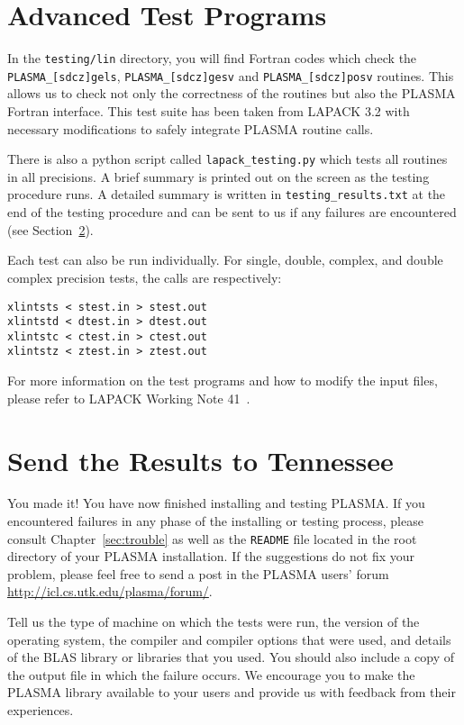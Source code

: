 \section{Advanced Test Programs}
In the \texttt{testing/lin} directory, you will find Fortran codes which check
the \texttt{PLASMA\_[sdcz]gels}, \texttt{PLASMA\_[sdcz]gesv} and \texttt{PLASMA\_[sdcz]posv} routines. 
This allows us to check not only the correctness of the routines but also the PLASMA 
Fortran interface. This test suite has been taken from LAPACK 3.2 with
necessary modifications to safely integrate PLASMA routine calls.

There is also a python script called \texttt{lapack\_testing.py} which tests all routines
in all precisions. A brief summary is printed out on the screen as the testing procedure runs. A detailed summary is written
in \texttt{testing\_results.txt} at the end of the testing procedure and can be sent to us if any 
failures are encountered (see Section~\ref{sec:contact}).

Each test can also be run individually.  For single, double, complex,
and double complex precision tests, the calls are respectively:
\begin{verbatim}
xlintsts < stest.in > stest.out
xlintstd < dtest.in > dtest.out
xlintstc < ctest.in > ctest.out
xlintstz < ztest.in > ztest.out
\end{verbatim}

For more information
on the test programs and how to modify the input files, please refer to LAPACK Working
Note 41~\cite{Blackford:1992:IGL}.

\section{Send the Results to Tennessee}
\label{sec:contact}
You made it! You have now finished installing and testing PLASMA. If
you encountered failures in any phase of the installing or testing
 process, please consult Chapter~\ref{sec:trouble} as well as the \texttt{README} 
file located in the root directory of your PLASMA installation.
If the suggestions do not fix your problem, please feel free to send a post 
in the PLASMA users' forum \url{http://icl.cs.utk.edu/plasma/forum/}.

Tell us the type of machine on which the tests were run, the version of the operating
system, the compiler and compiler options that were used, and details of the BLAS library
or libraries that you used. You should also include a copy of the output file in which the
failure occurs.
We encourage you to make the PLASMA library available to your users and provide us
with feedback from their experiences.
